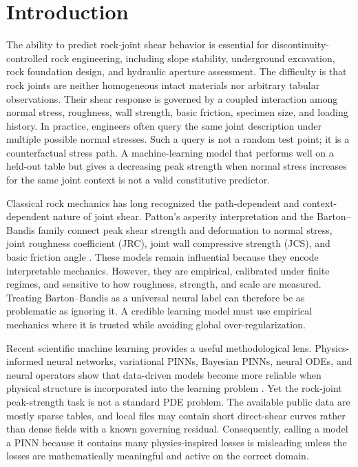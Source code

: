 \documentclass[journal]{IEEEtran}
\begin{document}
\section{Introduction}
The ability to predict rock-joint shear behavior is essential for discontinuity-controlled rock engineering, including slope stability, underground excavation, rock foundation design, and hydraulic aperture assessment. The difficulty is that rock joints are neither homogeneous intact materials nor arbitrary tabular observations. Their shear response is governed by a coupled interaction among normal stress, roughness, wall strength, basic friction, specimen size, and loading history. In practice, engineers often query the same joint description under multiple possible normal stresses. Such a query is not a random test point; it is a counterfactual stress path. A machine-learning model that performs well on a held-out table but gives a decreasing peak strength when normal stress increases for the same joint context is not a valid constitutive predictor.

Classical rock mechanics has long recognized the path-dependent and context-dependent nature of joint shear. Patton's asperity interpretation and the Barton--Bandis family connect peak shear strength and deformation to normal stress, joint roughness coefficient (JRC), joint wall compressive strength (JCS), and basic friction angle \cite{patton1966multiple,barton1973review,barton1977shear,bandis1983fundamentals,barton1985strength}. These models remain influential because they encode interpretable mechanics. However, they are empirical, calibrated under finite regimes, and sensitive to how roughness, strength, and scale are measured. Treating Barton--Bandis as a universal neural label can therefore be as problematic as ignoring it. A credible learning model must use empirical mechanics where it is trusted while avoiding global over-regularization.

Recent scientific machine learning provides a useful methodological lens. Physics-informed neural networks, variational PINNs, Bayesian PINNs, neural ODEs, and neural operators show that data-driven models become more reliable when physical structure is incorporated into the learning problem \cite{lagaris1998artificial,raissi2019physics,sirignano2018dgm,weinan2018deep,han2018solving,karniadakis2021physics,lu2021deepxde,lu2021deeponet,pang2019fpinns,kharazmi2021hpvpinns,chen2018neural,li2021fourier,kovachki2023neural}. Yet the rock-joint peak-strength task is not a standard PDE problem. The available public data are mostly sparse tables, and local files may contain short direct-shear curves rather than dense fields with a known governing residual. Consequently, calling a model a PINN because it contains many physics-inspired losses is misleading unless the losses are mathematically meaningful and active on the correct domain.
\end{document}
